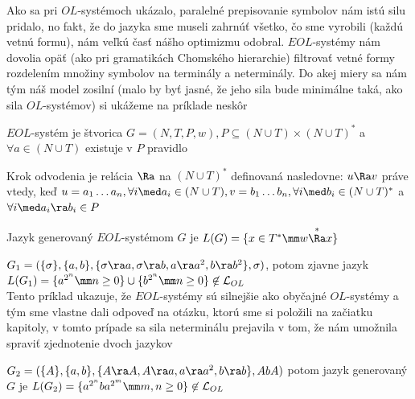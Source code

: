 Ako sa pri $OL$-systémoch ukázalo, paralelné prepisovanie symbolov
nám istú silu pridalo, no fakt, že do jazyka sme museli zahrnúť
všetko, čo sme vyrobili (každú vetnú formu), nám veľkú časť nášho
optimizmu odobral. $EOL$-systémy nám dovolia opäť (ako pri
gramatikách Chomského hierarchie) filtrovať vetné formy rozdelením
množiny symbolov na terminály a neterminály. Do akej miery sa nám
tým náš model zosilní (malo by byť jasné, že jeho sila bude
minimálne taká, ako sila $OL$-systémov) si ukážeme na príklade
neskôr

\begin{definicia}
$EOL$-systém je štvorica $G=(N,T,P,w), P\subseteq (N\cup
T)\times(N\cup T)^{*}$ a $\forall a\in (N\cup T)$ existuje v $P$
pravidlo
\end{definicia}

\begin{definicia}
Krok odvodenia je relácia $\Ra$ na $(N\cup T)^{*}$ definovaná
nasledovne: \mbox{$u\Ra v$} práve vtedy, keď $u=a_{1}\dots
a_{n},\forall i\med a_{i}\in(N\cup T),v=b_{1}\dots b_{n},\forall
i\med b_{i}\in(N\cup T)^{*}$ a $\forall i\med a_{i}\ra b_{i}\in P$
\end{definicia}

\begin{definicia}
Jazyk generovaný $EOL$-systémom $G$ je $L(G)=\{x\in T^{*}\mm
w\overset{*}\Ra x\}$
\end{definicia}

\begin{priklad}
$G_{1}=(\{\sigma\},\{a,b\},\{\sigma\ra a,\sigma\ra b,a\ra
a^{2},b\ra b^{2}\},\sigma)$, potom zjavne jazyk
$L(G_{1})=\{a^{2^{n}}\mm n\geq0 \}\cup\{b^{2^{n}}\mm
n\geq0\}\not\in\mathcal{L}_{OL}$\\ Tento príklad ukazuje, že
$EOL$-systémy sú silnejšie ako obyčajné $OL$-systémy a tým sme
vlastne dali odpoveď na otázku, ktorú sme si položili na začiatku
kapitoly, v tomto prípade sa sila neterminálu prejavila v tom, že
nám umožnila spraviť zjednotenie dvoch jazykov
\end{priklad}

\begin{priklad}
$G_{2}=(\{A\},\{a,b\},\{A\ra A,A\ra a,a\ra a^{2},b\ra b\},AbA)$
potom jazyk ge\-ne\-ro\-va\-ný $G$ je
$L(G_{2})=\{a^{2^{n}}ba^{2^{m}}\mm
m,n\geq0\}\not\in\mathcal{L}_{OL}$
\end{priklad}

